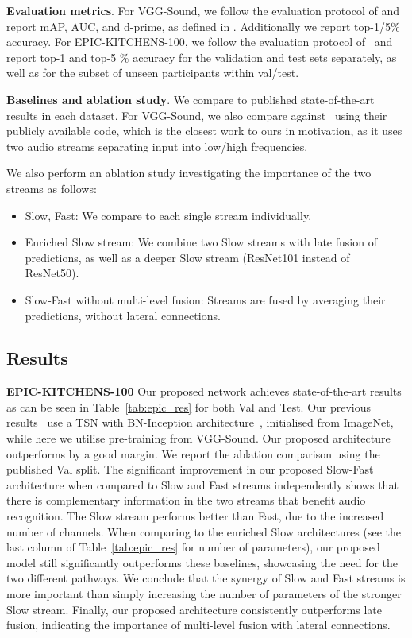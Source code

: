 \documentclass{article}
\begin{document}
\noindent\textbf{Evaluation metrics}. For VGG-Sound, we follow the evaluation protocol of \cite{vggsound,Hershey2017} and report mAP, AUC, and d-prime, as defined in \cite{Hershey2017}. Additionally we report top-1/5\% accuracy. For EPIC-KITCHENS-100, we follow the evaluation protocol of~\cite{Damen2020RESCALING} and report top-1 and top-5 \% accuracy for the validation and test sets separately, as well as for the subset of unseen participants within val/test.

\noindent\textbf{Baselines and ablation study}. We compare to published state-of-the-art results in each dataset. For VGG-Sound, we also compare against~\cite{mcdonnell_2020} using their publicly available code, which is the closest work to ours in motivation, as it uses two audio streams separating input into low/high frequencies.

We also perform an ablation study investigating the importance of the two streams as follows:
\begin{itemize}[leftmargin=*,itemsep=-2ex,partopsep=1ex,parsep=2ex]
\vspace*{-6pt}
    \item Slow, Fast: We compare to each single stream individually.
    \item Enriched Slow stream: We combine two Slow streams with late fusion of predictions, as well as a deeper Slow stream (ResNet101 instead of ResNet50).
    \item Slow-Fast without multi-level fusion: Streams are fused by averaging their predictions, without lateral connections.
\end{itemize}

\subsection{Results}
\label{subsec:res}

\textbf{EPIC-KITCHENS-100} Our proposed network achieves state-of-the-art results as can be seen in Table~\ref{tab:epic_res} for both Val and Test. Our previous results~\cite{Damen2020RESCALING} use a TSN with BN-Inception architecture~\cite{TSN2016ECCV}, initialised from ImageNet, while here we utilise pre-training from VGG-Sound. Our proposed architecture outperforms \cite{Damen2020RESCALING} by a good margin. 
We report the ablation comparison using the published Val split.
The significant improvement in our proposed Slow-Fast architecture when compared to Slow and Fast streams independently shows that there is complementary information in the two streams that benefit audio recognition. The Slow stream performs better than Fast, due to the increased number of channels. When comparing to the enriched Slow architectures (see the last column of Table~\ref{tab:epic_res} for number of parameters), 
our proposed model still significantly outperforms these baselines, showcasing the need for the two different pathways. We conclude that the synergy of Slow and Fast streams is more important than simply increasing the number of parameters of the stronger Slow stream. Finally, our proposed architecture consistently outperforms late fusion, indicating the importance of multi-level fusion with lateral connections.
\end{document}
